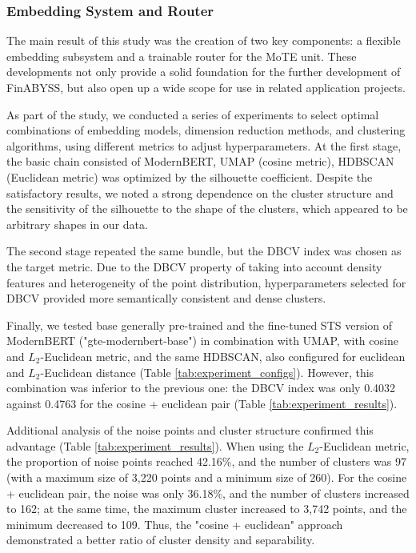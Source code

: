 \subsubsection{Embedding System and Router}
\label{sec:emb_sys_and_router}
The main result of this study was the creation of two key components: a flexible embedding
subsystem and a trainable router for the MoTE unit. These developments not only provide
a solid foundation for the further development of FinABYSS, but also open up a wide scope
for use in related application projects.

As part of the study, we conducted a series of experiments to select optimal combinations
of embedding models, dimension reduction methods, and clustering algorithms, using different
metrics to adjust hyperparameters. At the first stage, the basic chain consisted of ModernBERT,
UMAP (cosine metric), HDBSCAN (Euclidean metric) was optimized by the silhouette coefficient.
Despite the satisfactory results, we noted a strong dependence on the cluster structure and
the sensitivity of the silhouette to the shape of the clusters, which appeared to be arbitrary
shapes in our data.

The second stage repeated the same bundle, but the DBCV index was chosen as the target metric. Due
to the DBCV property of taking into account density features and heterogeneity of the point
distribution, hyperparameters selected for DBCV provided more semantically consistent and dense
clusters.

Finally, we tested base generally pre-trained and the fine-tuned STS version of ModernBERT
("gte-modernbert-base") \parencite{MGTE2024} in combination with UMAP, with cosine and
$L_2$-Euclidean metric, and the same HDBSCAN, also configured for euclidean and $L_2$-Euclidean
distance (Table \ref{tab:experiment_configs}). However, this combination was inferior
to the previous one: the DBCV index was only 0.4032 against 0.4763 for the cosine + euclidean pair
(Table \ref{tab:experiment_results}).



Additional analysis of the noise points and cluster structure confirmed this advantage
(Table \ref{tab:experiment_results}). When using the $L_2$-Euclidean metric, the proportion
of noise points reached 42.16\%, and the number of clusters was 97 (with a maximum size
of 3,220 points and a minimum size of 260). For the cosine + euclidean pair, the noise was
only 36.18\%, and the number of clusters increased to 162; at the same time, the maximum
cluster increased to 3,742 points, and the minimum decreased to 109. Thus, the "cosine +
euclidean" approach demonstrated a better ratio of cluster density and separability.

